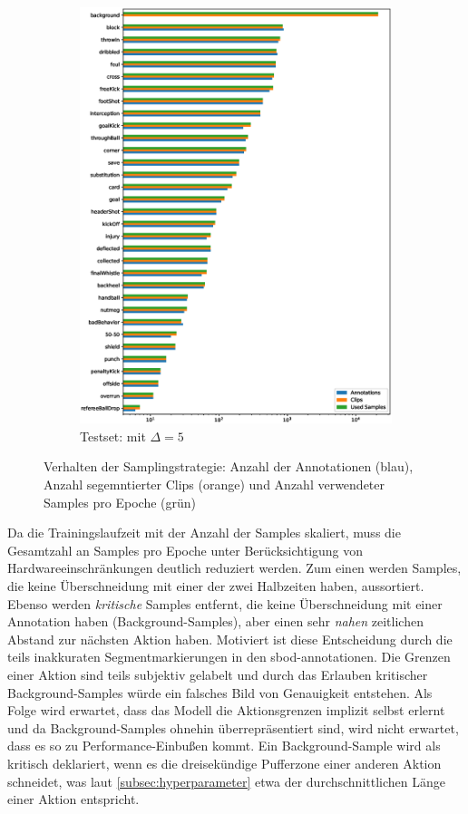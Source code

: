 \begin{figure}
\begin{subfigure}[b]{.33\textwidth}
        \includegraphics[width=.95\linewidth]{img/05_class_distribution_test_delta_5.eps}
        \caption{Testset: \newline mit $\Delta=5$}
    \end{subfigure}
    \caption{Verhalten der Samplingstrategie: Anzahl der Annotationen (blau), Anzahl segemntierter Clips (orange) und Anzahl verwendeter Samples pro Epoche (grün)}
    \label{fig:samples}
\end{figure}

Da die Trainingslaufzeit mit der Anzahl der Samples skaliert, muss die Gesamtzahl an Samples pro Epoche unter Berücksichtigung von Hardwareeinschränkungen deutlich reduziert werden.
Zum einen werden Samples, die keine Überschneidung mit einer der zwei Halbzeiten haben, aussortiert.
Ebenso werden \emph{kritische} Samples entfernt, die keine Überschneidung mit einer Annotation haben (Background-Samples), aber einen sehr \emph{nahen} zeitlichen Abstand zur nächsten Aktion haben.
Motiviert ist diese Entscheidung durch die teils inakkuraten Segmentmarkierungen in den \gls{sbod}-\gls{annotationen}.
Die Grenzen einer Aktion sind teils subjektiv gelabelt und durch das Erlauben kritischer Background-Samples würde ein falsches Bild von Genauigkeit entstehen.
Als Folge wird erwartet, dass das Modell die Aktionsgrenzen implizit selbst erlernt und da Background-Samples ohnehin überrepräsentiert sind, wird nicht erwartet, dass es so zu Performance-Einbußen kommt.
Ein Background-Sample wird als kritisch deklariert, wenn es die dreisekündige Pufferzone einer anderen Aktion schneidet, was laut \autoref{subsec:hyperparameter} etwa der durchschnittlichen Länge einer Aktion entspricht.

